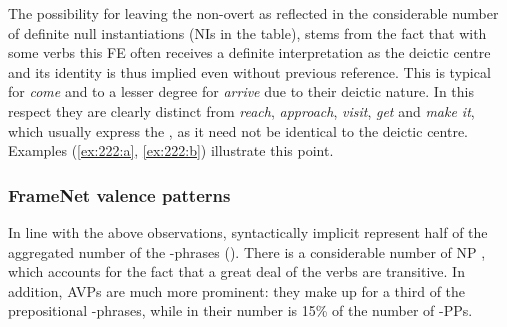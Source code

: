 \documentclass[output=paper,colorlinks,citecolor=brown]{langscibook}
\begin{document}
The possibility for leaving the  non-overt as reflected in the considerable number of definite null instantiations (NIs in the table), stems from the fact that with some verbs this FE often receives a definite interpretation as the %
deictic centre and its identity is thus implied even without previous reference. 
This is typical for \textit{come} and to a lesser degree for \textit{arrive} due to their deictic nature. In this respect they are clearly distinct from \textit{reach}, %
 \textit{approach}, \textit{visit}, \textit{get} and \textit{make it}, which usually express the , as it need not be identical to the deictic centre. Examples (\ref{ex:222:a}, \ref{ex:222:b}) illustrate this point.

\begin{exe}
\ex \label{ex:222}
\begin{xlist}
 \end{xlist}
\end{exe}


\subsubsection{FrameNet valence patterns}

In line with the above observations, syntactically implicit  represent half of the aggregated number of the -phrases (). There is a considerable number of NP , which accounts for the fact that a great deal of the verbs are transitive. In addition, AVPs are much more prominent: they make up for a third of the prepositional -phrases, while in  their number is 15\% of the number of -PPs.
\end{document}
